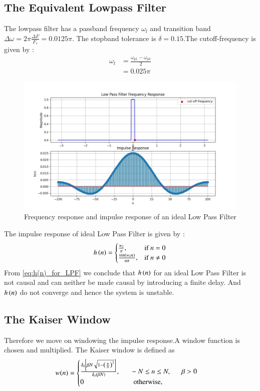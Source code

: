 \documentclass{article}
\begin{document}
\subsection{The Equivalent Lowpass Filter}
The lowpass filter has a passband frequency $\omega_l$ and transition band $\Delta \omega = 2\pi \frac{\Delta F}{F_s} = 0.0125\pi$.
The stopband tolerance is $\delta=0.15$.The cutoff-frequency is given by :
\begin{align}
    \omega_{l} &= \frac{\omega_{p1}-\omega_{p2}}{2}\\
                &= 0.025\pi
\end{align}
\begin{figure}[H]
\centering
\includegraphics[width=1\columnwidth]{figs/lpf_f_resp.png}
\caption{Frequency response and impulse response of an ideal Low Pass Filter}
\label{fig:LPF_FIR_1}
\end{figure}

The impulse response of ideal Low Pass Filter is given by :
\begin{align}
    h\left(n\right) = 
\begin{cases} 
    \frac{w_l}{\pi}, & \text{if } n = 0 \\
    \frac{\sin(w_l n)}{n\pi}, & \text{if } n \neq 0
\end{cases} \label{eq:h(n)_for_LPF}
\end{align}
From \eqref{eq:h(n)_for_LPF} we conclude that $h\left(n\right)$ for an ideal Low Pass Filter is not causal and can neither be made causal by introducing a finite delay. And $h\left(n\right)$ do not converge and hence the system is unstable.
\subsection{The Kaiser Window}
Therefore we move on windowing the impulse response.A window function is chosen and multiplied. The Kaiser window is defined as
\begin{align}
    w(n) =
    \begin{cases}
    \frac{I_0\left[ \beta N \sqrt{1 - \left(\frac{n}{N}\right)^2} \right]}{I_0(\beta N)},
\indent -N \leq n \leq N, \indent \beta > 0 \nonumber \\
 0 \hspace{2.5 cm} \mbox{otherwise,}
 \end{cases}
\end{align}
\end{document}
